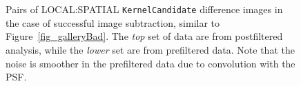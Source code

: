 \documentclass[prd, nofootinbib, floatfix, 11pt,tightenlines,times]{article}
\begin{document}
{\begin{figure}
\begin{center}
 \\
 \\
\end{center}
\caption{Pairs of LOCAL:SPATIAL {\tt KernelCandidate} difference images in the case of
  successful image subtraction, similar to
  Figure~\ref{fig_galleryBad}.  The {\it top} set of data are from
  postfiltered analysis, while the {\it lower} set are from
  prefiltered data.  Note that the noise is smoother in the
  prefiltered data due to convolution with the PSF. }
\label{fig_galleryGood}
\end{figure}

}
\end{document}
